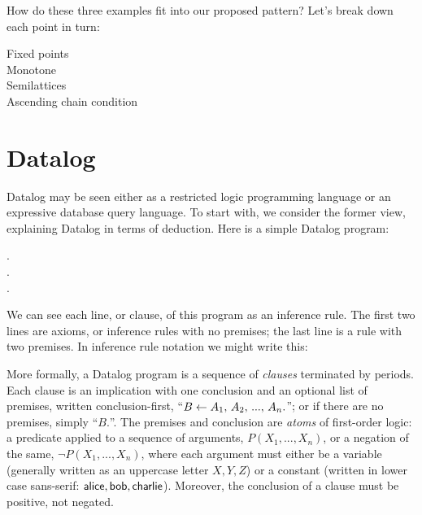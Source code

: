 \noindent
How do these three examples fit into our proposed pattern? Let's break down each point in turn:

\begin{description}
\item[Fixed points] \XXX
\item[Monotone] \XXX
\item[Semilattices] \XXX
\item[Ascending chain condition] \XXX
\end{description}



\section{Datalog}
\label{section-datalog}

Datalog may be seen either as a restricted logic programming language or an
expressive database query language. To start with, we consider the former view,
explaining Datalog in terms of deduction. Here is a simple Datalog program:

\begin{datalog}
  .
  \\
  .
  \\
   \gets {} \conj {}.
\end{datalog}

\noindent
We can see each line, or clause, of this program as an inference rule. The first
two lines are axioms, or inference rules with no premises; the last line is a
rule with two premises. In inference rule notation we might write this:
%
\begin{mathpar}


\end{mathpar}

\noindent
More formally, a Datalog program is a sequence of \emph{clauses} terminated by
periods. Each clause is an implication with one conclusion and an optional list
of premises, written conclusion-first, ``$B \gets A_1 \conj A_2 \conj ... \conj
A_n.$''; or if there are no premises, simply ``$B.$''. The premises and
conclusion are \emph{atoms} of first-order logic: a predicate applied to a
sequence of arguments, $P(X_1, ..., X_n)$, or a negation of the same, $\neg
P(X_1, ..., X_n)$, where each argument must either be a variable (generally
written as an uppercase letter $X,Y,Z$) or a constant (written in lower case
sans-serif: $\datum{alice}, \datum{bob}, \datum{charlie}$). Moreover, the
conclusion of a clause must be positive, not negated.

